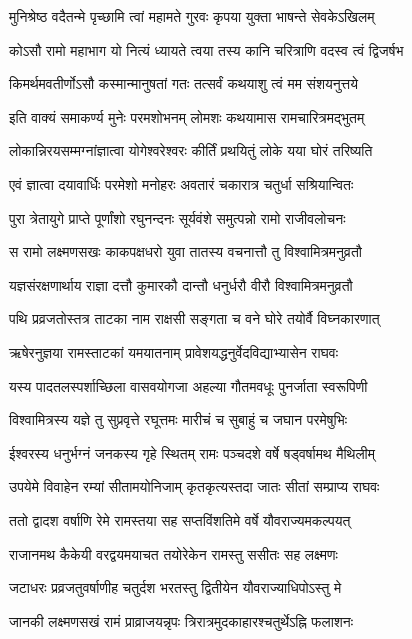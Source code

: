 \twolineshloka
{मुनिश्रेष्ठ वदैतन्मे पृच्छामि त्वां महामते}
{गुरवः कृपया युक्ता भाषन्ते सेवकेऽखिलम्}%

\twolineshloka
{कोऽसौ रामो महाभाग यो नित्यं ध्यायते त्वया}
{तस्य कानि चरित्राणि वदस्व त्वं द्विजर्षभ}%

\twolineshloka
{किमर्थमवतीर्णोऽसौ कस्मान्मानुषतां गतः}
{तत्सर्वं कथयाशु त्वं मम संशयनुत्तये}%


\twolineshloka
{इति वाक्यं समाकर्ण्य मुनेः परमशोभनम्}
{लोमशः कथयामास रामचारित्रमद्भुतम्}%

\twolineshloka
{लोकान्निरयसम्मग्नांज्ञात्वा योगेश्वरेश्वरः}
{कीर्तिं प्रथयितुं लोके यया घोरं तरिष्यति}%

\twolineshloka
{एवं ज्ञात्वा दयावार्धिः परमेशो मनोहरः}
{अवतारं चकारात्र चतुर्धा सश्रियान्वितः}%

\twolineshloka
{पुरा त्रेतायुगे प्राप्ते पूर्णांशो रघुनन्दनः}
{सूर्यवंशे समुत्पन्नो रामो राजीवलोचनः}%

\twolineshloka
{स रामो लक्ष्मणसखः काकपक्षधरो युवा}
{तातस्य वचनात्तौ तु विश्वामित्रमनुव्रतौ}%

\twolineshloka
{यज्ञसंरक्षणार्थाय राज्ञा दत्तौ कुमारकौ}
{दान्तौ धनुर्धरौ वीरौ विश्वामित्रमनुव्रतौ}%

\twolineshloka
{पथि प्रव्रजतोस्तत्र ताटका नाम राक्षसी}
{सङ्गता च वने घोरे तयोर्वै विघ्नकारणात्}%

\twolineshloka
{ऋषेरनुज्ञया रामस्ताटकां यमयातनाम्}
{प्रावेशयद्धनुर्वेदविद्याभ्यासेन राघवः}%

\twolineshloka
{यस्य पादतलस्पर्शाच्छिला वासवयोगजा}
{अहल्या गौतमवधूः पुनर्जाता स्वरूपिणी}%

\twolineshloka
{विश्वामित्रस्य यज्ञे तु सुप्रवृत्ते रघूत्तमः}
{मारीचं च सुबाहुं च जघान परमेषुभिः}%

\twolineshloka
{ईश्वरस्य धनुर्भग्नं जनकस्य गृहे स्थितम्}
{रामः पञ्चदशे वर्षे षड्वर्षामथ मैथिलीम्}%

\twolineshloka
{उपयेमे विवाहेन रम्यां सीतामयोनिजाम्}
{कृतकृत्यस्तदा जातः सीतां सम्प्राप्य राघवः}%

\twolineshloka
{ततो द्वादश वर्षाणि रेमे रामस्तया सह}
{सप्तविंशतिमे वर्षे यौवराज्यमकल्पयत्}%

\twolineshloka
{राजानमथ कैकेयी वरद्वयमयाचत}
{तयोरेकेन रामस्तु ससीतः सह लक्ष्मणः}%

\twolineshloka
{जटाधरः प्रव्रजतुवर्षाणीह चतुर्दश}
{भरतस्तु द्वितीयेन यौवराज्याधिपोऽस्तु मे}%

\twolineshloka
{जानकी लक्ष्मणसखं रामं प्राव्राजयन्नृपः}
{त्रिरात्रमुदकाहारश्चतुर्थेऽह्नि फलाशनः}%

